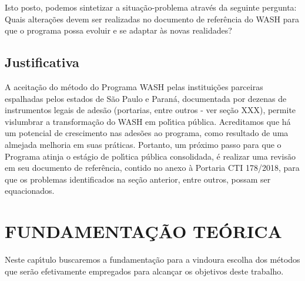 \documentclass[
12pt,		%
openright,	%
twoside,  %
a4paper,			%
chapter=TITLE,		%
english,			%
french,				%
spanish,			%
brazil				%
]{USPSC-classe/USPSC}
\begin{document}
Isto posto, podemos sintetizar a situa\c{c}\~ao-problema atrav\'es da seguinte pergunta: \textquotedbl Quais altera\c{c}\~oes devem ser realizadas no documento de refer\^encia do WASH para que o programa possa evoluir e se adaptar \`as novas realidades?\textquotedbl 

















\section[Justificativa]{Justificativa}\label{Justificativa}
A aceita\c{c}\~ao do m\'etodo do Programa WASH pelas institui\c{c}\~oes parceiras espalhadas pelos estados de S\~ao Paulo e Paran\'a, documentada por dezenas de instrumentos legais de ades\~ao (portarias, entre outros - ver se\c{c}\~ao XXX), permite vislumbrar a transforma\c{c}\~ao do WASH em pol\'{\i}tica p\'ublica. Acreditamos que h\'a um potencial de crescimento nas ades\~oes ao programa, como resultado de uma almejada melhoria em suas pr\'aticas. Portanto, um pr\'oximo passo para que o Programa atinja o est\'agio de pol\'{\i}tica p\'ublica consolidada, \'e realizar uma revis\~ao em seu documento de refer\^encia, contido no anexo \`a Portaria CTI 178/2018, para que os problemas identificados na se\c{c}\~ao anterior, entre outros, possam ser equacionados.

















\chapter[FUNDAMENTA\c{C}\~AO TE\'ORICA ]{FUNDAMENTA\c{C}\~AO TE\'ORICA }\label{FUNDAMENTA\c{C}\~AO TE\'ORICA }
Neste cap\'{\i}tulo buscaremos a fundamenta\c{c}\~ao para a vindoura escolha dos m\'etodos que ser\~ao efetivamente empregados para alcan\c{c}ar os objetivos deste trabalho.
\end{document}
